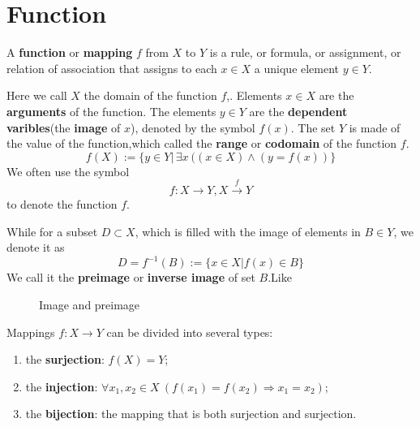 \section{Function}

A \textbf{function} or \textbf{mapping} $f$ from $X$ to $Y$ is a rule, or formula, or assignment, or relation of association that assigns to each $x\in X$ a unique element $y\in Y$.

Here we call $X$ the domain of the function $f$,. Elements $x\in X$ are the \textbf{arguments}  of the function. The elements $y\in Y$ are the \textbf{dependent varibles}(the \textbf{image} of $x$), denoted by the symbol $f(x)$.
The set $Y$ is made of the value of the function,which called the \textbf{range} or \textbf{codomain} of the function $f$.
\[f(X):=\{y\in Y|\, \exists x\ ((x\in X)\wedge(y=f(x))\}\]
We often use the symbol \[f:X\longrightarrow Y,X\stackrel{f}{\longrightarrow}Y\]to denote the function $f$.


While for a subset $D\subset X$, which is filled with the image of elements in $B\in Y$, we denote it as
\[D=f^{-1}(B):=\{x\in X|f(x)\in B\}\]
We call it the \textbf{preimage} or \textbf{inverse image} of set $B$.Like 
\begin{figure}[ht]\label{Image and preimage}
    \centering
    \caption{Image and preimage}
    
\end{figure}

Mappings $f:X\rightarrow Y$ can be divided into several types:
\begin{enumerate}
    \item the \textbf{surjection}: $f(X)=Y$;
    \item the \textbf{injection}: $\forall x_{1},x_{2}\in X\ (f(x_{1})=f(x_{2})\Rightarrow x_{1}=x_{2})$;
    \item the \textbf{bijection}: the mapping that is both surjection and surjection.
\end{enumerate}
